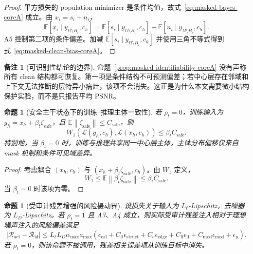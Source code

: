 \documentclass[11pt,a4paper,UTF8,fontset=fandol]{ctexart}
\newtheorem{proposition}[theorem]{命题}
\theoremstyle{definition}
\newtheorem{remark}[theorem]{备注}
\newcommand{\norm}[1]{\left\lVert#1\right\rVert}
\newcommand{\abs}[1]{\left\lvert#1\right\rvert}
\newcommand{\E}{\mathbb{E}}
\begin{document}
\begin{proof}
平方损失的 population minimizer 是条件均值，故式~\eqref{eq:masked-bayes-coreA} 成立。由 $x_i=s_i+n_i$，
\begin{equation}
    \E[x_i\mid y_{\Omega\setminus B_i},c_h]
    =\E[s_i\mid y_{\Omega\setminus B_i},c_h]
    +\E[n_i\mid y_{\Omega\setminus B_i},c_h].
\end{equation}
A5 控制第二项的条件偏差。加减 $\E[s_i\mid y_{\Omega\setminus B_i},c_h]$ 并使用三角不等式得到式~\eqref{eq:masked-clean-bias-coreA}。
\end{proof}

\begin{remark}[可识别性结论的边界]
命题~\ref{prop:masked-identifiability-coreA} 没有声称所有 clean 结构都可恢复。第一项是条件结构不可预测偏差；若中心层存在邻域和上下文无法推断的层特异小病灶，该项不会消失。这正是为什么本文需要微小结构保护实验，而不是只报告平均 PSNR。
\end{remark}


\begin{proposition}[安全主干状态下的训练--推理主体一致性]
\label{prop:safe-shift-auditA}
若 $\rho_t=0$，训练输入为 $y_h=x_h+\beta_t\zeta_{\mathrm{safe}}$，且 $\E\norm{\zeta_{\mathrm{safe}}}\le C_{\mathrm{safe}}$，则
\begin{equation}
\label{eq:safe-shift-auditA}
    W_1(\mathcal L(y_h,c_h),\mathcal L(x_h,c_h))
    \le \beta_t C_{\mathrm{safe}}.
\end{equation}
特别地，当 $\beta_t=0$ 时，训练与推理共享同一中心层主体，主体分布偏移仅来自 mask 机制和条件可见域差异。
\end{proposition}

\begin{proof}
考虑耦合 $(x_h,c_h)$ 与 $(x_h+\beta_t\zeta_{\mathrm{safe}},c_h)$。由 $W_1$ 定义，
\begin{equation}
    W_1\le \E\norm{\beta_t\zeta_{\mathrm{safe}}}\le \beta_tC_{\mathrm{safe}}.
\end{equation}
当 $\beta_t=0$ 时该项为零。
\end{proof}

\begin{proposition}[受审计残差增强的风险摄动界]
\label{prop:residual-risk-gated-auditA}
设损失关于输入为 $L_\ell$-Lipschitz，去噪器为 $L_D$-Lipschitz。若 $\rho_t=1$ 且 A3、A4 成立，则实际受审计残差注入相对于理想噪声注入的风险偏差满足
\begin{equation}
\label{eq:residual-risk-bound-auditA}
    \abs{\mathcal R_{\mathrm{act}}-\mathcal R_{\mathrm{id}}}
    \le
    L_\ell L_D\alpha_{\max}a_{\max}
    \left(
    \epsilon_{\mathrm{cal}}
    +C_{\mathcal S}\epsilon_{\mathrm{struct}}
    +C_e\epsilon_{\mathrm{edge}}
    +C_{\mathrm{lf}}\epsilon_{\mathrm{lf}}
    +C_{\mathrm{mod}}\epsilon_{\mathrm{mod}}
    +\epsilon_\mu
    \right).
\end{equation}
若 $\rho_t=0$，则该命题不被调用，残差相关误差项从训练目标中消失。
\end{proposition}
\end{document}
